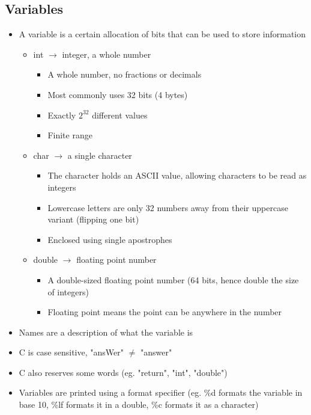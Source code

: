 \documentclass{article}
\begin{document}
	\subsection{Variables}
		\begin{itemize}
			\item A variable is a certain allocation of bits that can be used to store information
				\begin{itemize}
					\item \textcolor{pastel_blue}{int} $\rightarrow$ integer, a whole number
						\begin{itemize}
							\item A whole number, no fractions or decimals
							\item Most commonly uses 32 bits (4 bytes)
							\item Exactly $2^{32}$ different values
							\item Finite range
						\end{itemize}
					\item \textcolor{pastel_blue}{char} $\rightarrow$ a single character
						\begin{itemize}
							\item The character holds an ASCII value, allowing characters to be read as integers
							\item Lowercase letters are only 32 numbers away from their uppercase variant (flipping one bit)
							\item Enclosed using single apostrophes
						\end{itemize}
					\item \textcolor{pastel_blue}{double} $\rightarrow$ floating point number
						\begin{itemize}
							\item A double-sized floating point number (64 bits, hence double the size of integers)
							\item Floating point means the point can be anywhere in the number
						\end{itemize}
				\end{itemize}
			\item Names are a description of what the variable is
			\item C is case sensitive, "ansWer" \textcolor{pastel_red}{$\neq$} "answer"
			\item C also reserves some words (eg. "return", "int", "double")
			\item Variables are printed using a format specifier (eg. \textcolor{pastel_green}{\%d} formats the variable in base 10, \textcolor{pastel_green}{\%lf} formats it in a double, \textcolor{pastel_green}{\%c} formats it as a character)

\end{itemize}
\end{document}

